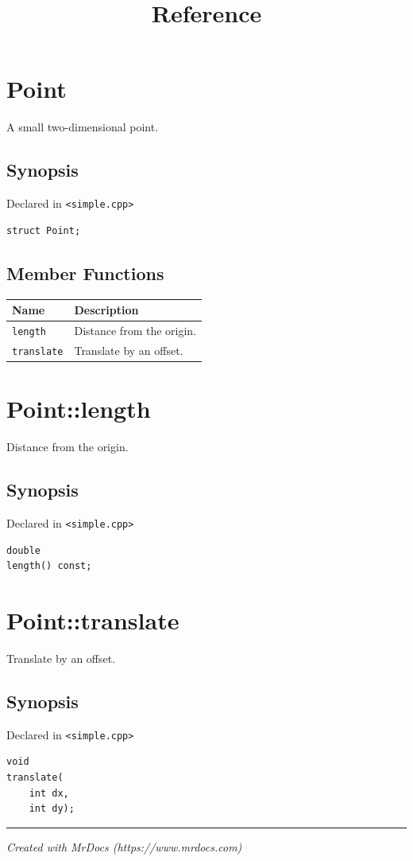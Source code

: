 \documentclass{article}
\title{Reference}
\begin{document}
\maketitle
\section{Point}

A small two-dimensional point.

\subsection{Synopsis}

Declared in \texttt{<simple.cpp>}

\begin{verbatim}
struct Point;
\end{verbatim}

\subsection{Member Functions}

\begin{tabular}{ll}
\textbf{Name} & \textbf{Description} \\
\hline
\texttt{length}  & Distance from the origin. \\
\texttt{translate}  & Translate by an offset. \\
\end{tabular}


\section{Point::length}

Distance from the origin.

\subsection{Synopsis}

Declared in \texttt{<simple.cpp>}

\begin{verbatim}
double
length() const;
\end{verbatim}

\section{Point::translate}

Translate by an offset.

\subsection{Synopsis}

Declared in \texttt{<simple.cpp>}

\begin{verbatim}
void
translate(
    int dx,
    int dy);
\end{verbatim}


\vfill
\hrule
\vspace{0.5em}
\emph{Created with MrDocs (https://www.mrdocs.com)}
\end{document}
